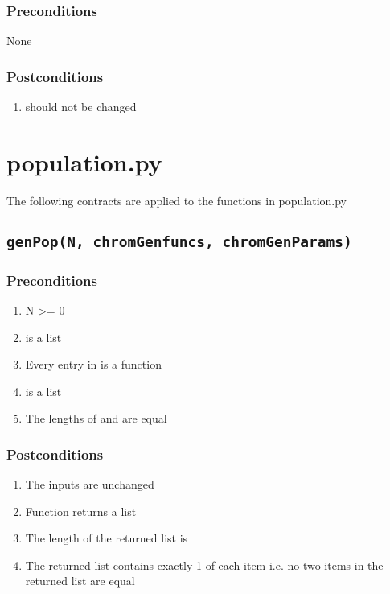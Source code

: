 \documentclass[letterpaper,10pt,english]{sphinxmanual}
\begin{document}
\subsubsection{Preconditions}
\label{contracts:id15}
None


\subsubsection{Postconditions}
\label{contracts:id16}\begin{enumerate}
\item {} 
 should not be changed

\end{enumerate}


\section{population.py}
\label{contracts:population-py}
The following contracts are applied to the functions in population.py


\subsection{\texttt{genPop(N, chromGenfuncs, chromGenParams)}}
\label{contracts:genpop-n-chromgenfuncs-chromgenparams}

\subsubsection{Preconditions}
\label{contracts:id17}\begin{enumerate}
\item {} 
N \textgreater{}= 0

\item {} 
 is a list

\item {} 
Every entry in  is a function

\item {} 
 is a list

\item {} 
The lengths of  and  are equal

\end{enumerate}


\subsubsection{Postconditions}
\label{contracts:id18}\begin{enumerate}
\item {} 
The inputs are unchanged

\item {} 
Function returns a list

\item {} 
The length of the returned list is 

\item {} 
The returned list contains exactly 1 of each item i.e. no two items in the returned list are equal

\end{enumerate}
\end{document}
